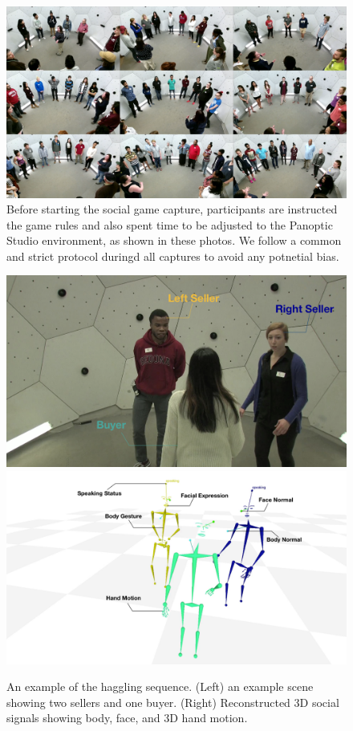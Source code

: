 \begin{figure}
	\centering
	\includegraphics[trim=0 0 0 0,clip,width=\linewidth]{ssp_fig/haggling_intro}
	\caption{Before starting the social game capture, participants are instructed the game rules and also spent time to be adjusted to the Panoptic Studio environment, as shown in these photos. We follow a common and strict protocol duringd all captures to avoid any potnetial bias.} 
	\label{fig:haggling_intro}
\end{figure}

\begin{figure}
	\centering
	\includegraphics[trim=300 0 0 0,clip,width=0.49\linewidth]{ssp_fig/haggling_ex_input}
	\includegraphics[trim=300 0 0 0,clip,width=0.49\linewidth]{ssp_fig/haggling_ex_measure}
	\caption{An example of the haggling sequence. (Left) an example scene showing two sellers and one buyer. (Right) Reconstructed 3D social signals showing body, face, and 3D hand motion.} 
	\label{fig:haggling_example}
\end{figure}

